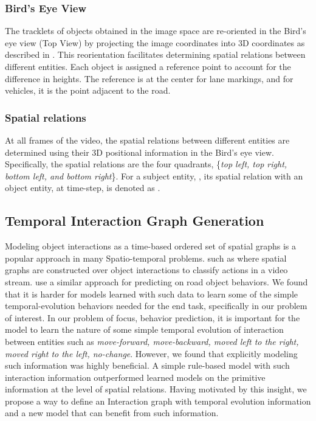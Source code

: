 \documentclass[letterpaper, 10 pt, conference]{ieeeconf}
\begin{document}
\subsubsection{Bird's Eye View} \label{sec:Birds_Eye_View}
The tracklets of objects obtained in the image space are re-oriented in the Bird's eye view (Top View) by projecting the image coordinates into 3D coordinates as described in \cite{DBLP:conf/cvpr/SongC14}. This reorientation facilitates determining spatial relations between different entities. Each object is assigned a reference point to account for the difference in heights. The reference is at the center for lane markings, and for vehicles, it is the point adjacent to the road. 


\subsubsection{Spatial relations}
At all  frames of the video, the spatial relations between different entities are determined using their 3D positional information in the Bird's eye view. Specifically, the spatial relations are the four quadrants, \{\textit{top left, top right, bottom left, and bottom right}\}. For a subject entity, , its spatial relation with an object entity,  at time-step,  is denoted as . 





\subsection{Temporal Interaction Graph Generation}
\label{sec:SceneGraph}
Modeling object interactions as a time-based ordered set of spatial graphs is a popular approach in many Spatio-temporal problems.
such as  \cite{geng2020spatio,ji2020action,herzig2019spatio,wang2018videos} where spatial graphs are constructed over object interactions   to classify actions in a video stream. \cite{jain2016structural, mylavarapu2020accurate} use a similar approach for predicting on road object behaviors. We found that it is harder for models learned with such data to learn some of the simple temporal-evolution behaviors needed for the end task, specifically in our problem of interest. In our problem of focus, behavior prediction, it is important for the model to learn the nature of some simple temporal evolution of interaction between entities such as \textit{move-forward, move-backward, moved left to the right, moved right to the left, no-change}. However, we found that explicitly modeling such information was highly beneficial. A simple rule-based model with such interaction information outperformed learned models on the primitive information at the level of spatial relations. Having motivated by this insight, we propose a way to define an Interaction graph with temporal evolution information and a new model that can benefit from such information.
\end{document}
